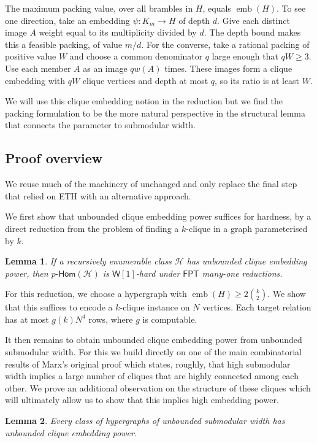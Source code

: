 \documentclass[11pt,letterpaper]{article}
\newtheorem{lemma}[lemma]{Lemma}
\theoremstyle{definition}
\theoremstyle{remark}
\newcommand{\cH}{\mathcal H}
\newcommand{\pHom}{p\text{-}\mathsf{Hom}}
\newcommand{\FPT}{\ensuremath{\mathsf{FPT}}}
\newcommand{\emb}{\operatorname{emb}}
\newcommand{\wone}{\ensuremath{\mathsf{W}[1]}}
\providecommand{\FPT}{\ensuremath{\mathsf{FPT}}}
\begin{document}
The maximum packing value, over all brambles in $H$, equals $\emb(H)$.
To see one direction, take an embedding $\psi:K_m\to H$ of depth $d$.
Give each distinct image $A$ weight equal to its multiplicity divided
by $d$. The depth bound makes this a feasible packing, of value $m/d$.
For the converse, take a rational packing of positive value $W$ and
choose a common denominator $q$ large enough that $qW\ge3$.
Use each member $A$ as an image
$qw(A)$ times. These images form a clique embedding with $qW$ clique
vertices and depth at most $q$, so its ratio is at least $W$.

%
%
%
%
%
%
%
We will use this clique embedding notion in the reduction but we find the packing formulation to be the more natural perspective in the structural lemma that connects the parameter to submodular width.

\subsection{Proof overview}
We reuse much of the machinery of \cite{Marx13} unchanged and only replace the final step that relied on ETH with an alternative approach.
%

We first show that unbounded clique embedding power suffices for hardness, by a direct reduction from the problem of finding a $k$-clique in a graph parameterised by $k$.

\begin{lemma}\label{lem:hard}
If a recursively enumerable class $\cH$ has unbounded clique
embedding power, then $\pHom(\cH)$ is $\wone$-hard under \FPT{}
many-one reductions.
\end{lemma}

For this reduction, we choose a hypergraph with $\emb(H)\ge2\binom{k}{2}$.
We show that this suffices to encode a $k$-clique instance on $N$ vertices.
Each target relation has at most $g(k)N^4$ rows, where $g$ is computable.

It then remains to obtain unbounded clique embedding power from
unbounded submodular width. For this we  build directly on one of the main combinatorial results of Marx's original proof which states, roughly, that high submodular width implies a large number of cliques that are highly connected among each other. We prove an additional observation on the structure of these cliques which will ultimately allow us to show that this implies high embedding power.

\begin{lemma}\label{lem:structural}
Every class of hypergraphs of unbounded submodular width has unbounded
clique embedding power.
\end{lemma}
\end{document}

